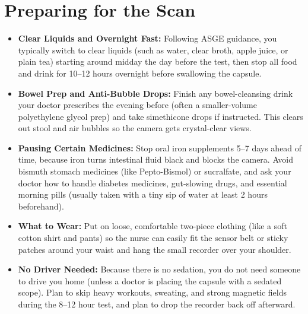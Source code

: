 \section{Preparing for the Scan}
\begin{itemize}
    \item \textbf{Clear Liquids and Overnight Fast:} Following ASGE guidance, you typically switch to clear liquids (such as water, clear broth, apple juice, or plain tea) starting around midday the day before the test, then stop all food and drink for 10--12 hours overnight before swallowing the capsule.
    \item \textbf{Bowel Prep and Anti-Bubble Drops:} Finish any bowel-cleansing drink your doctor prescribes the evening before (often a smaller-volume polyethylene glycol prep) and take simethicone drops if instructed. This clears out stool and air bubbles so the camera gets crystal-clear views.
    \item \textbf{Pausing Certain Medicines:} Stop oral iron supplements 5--7 days ahead of time, because iron turns intestinal fluid black and blocks the camera. Avoid bismuth stomach medicines (like Pepto-Bismol) or sucralfate, and ask your doctor how to handle diabetes medicines, gut-slowing drugs, and essential morning pills (usually taken with a tiny sip of water at least 2 hours beforehand).
    \item \textbf{What to Wear:} Put on loose, comfortable two-piece clothing (like a soft cotton shirt and pants) so the nurse can easily fit the sensor belt or sticky patches around your waist and hang the small recorder over your shoulder.
    \item \textbf{No Driver Needed:} Because there is no sedation, you do not need someone to drive you home (unless a doctor is placing the capsule with a sedated scope). Plan to skip heavy workouts, sweating, and strong magnetic fields during the 8--12 hour test, and plan to drop the recorder back off afterward.
\end{itemize}

